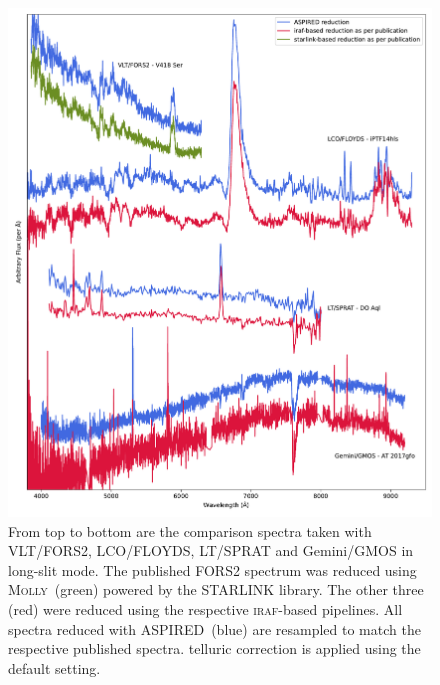\documentclass[linenumbers, twocolumn]{aastex631}
\begin{document}
\begin{figure}
    \centering
    \includegraphics[width=\textwidth]{fig_08_reduction_compared.pdf}
    \caption{From top to bottom are the comparison spectra taken with VLT/FORS2,
    LCO/FLOYDS, LT/SPRAT and Gemini/GMOS in long-slit mode. The published FORS2
    spectrum was reduced using \textsc{Molly}~(green) powered by the \textsc{STARLINK}
    library. The other three (red) were reduced using the respective \textsc{iraf}-based
    pipelines. All spectra reduced with \textsc{ASPIRED}~(blue) are resampled to match
    the respective published spectra. telluric correction is applied using the default
    setting.}
    \label{fig:reduction_compared}
\end{figure}
\end{document}
